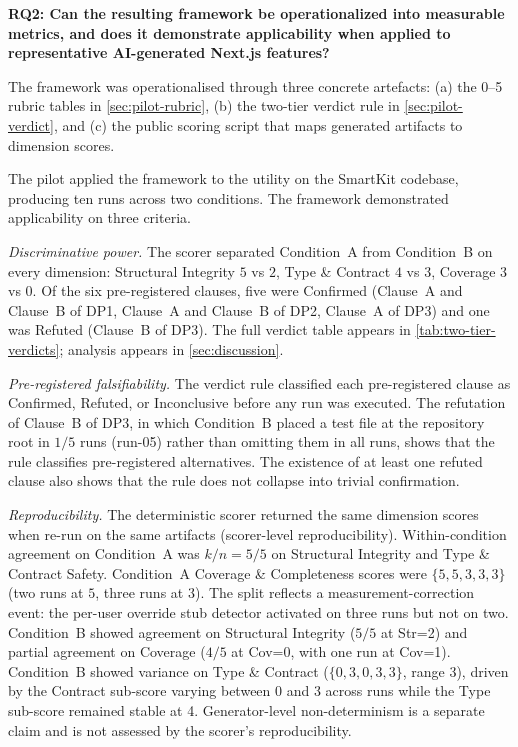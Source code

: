 \documentclass[12pt,a4paper]{report}
\begin{document}
\textbf{RQ2: Can the resulting framework be operationalized into measurable metrics, and does it demonstrate applicability when applied to representative AI-generated Next.js features?}

The framework was operationalised through three concrete artefacts: (a) the 0--5 rubric tables in \autoref{sec:pilot-rubric}, (b) the two-tier verdict rule in \autoref{sec:pilot-verdict}, and (c) the public scoring script that maps generated artifacts to dimension scores.

The pilot applied the framework to the  utility on the SmartKit codebase, producing ten runs across two conditions. The framework demonstrated applicability on three criteria.

\textit{Discriminative power.} The scorer separated Condition~A from Condition~B on every dimension: Structural Integrity $5$ vs $2$, Type \& Contract $4$ vs $3$, Coverage $3$ vs $0$. Of the six pre-registered clauses, five were Confirmed (Clause~A and Clause~B of DP1, Clause~A and Clause~B of DP2, Clause~A of DP3) and one was Refuted (Clause~B of DP3). The full verdict table appears in \autoref{tab:two-tier-verdicts}; analysis appears in \autoref{sec:discussion}.

\textit{Pre-registered falsifiability.} The verdict rule classified each pre-registered clause as Confirmed, Refuted, or Inconclusive before any run was executed. The refutation of Clause~B of DP3, in which Condition~B placed a test file at the repository root in $1/5$ runs (run-05) rather than omitting them in all runs, shows that the rule classifies pre-registered alternatives. The existence of at least one refuted clause also shows that the rule does not collapse into trivial confirmation.

\textit{Reproducibility.} The deterministic scorer returned the same dimension scores when re-run on the same artifacts (scorer-level reproducibility). Within-condition agreement on Condition~A was $k/n = 5/5$ on Structural Integrity and Type \& Contract Safety. Condition~A Coverage \& Completeness scores were $\{5, 5, 3, 3, 3\}$ (two runs at $5$, three runs at $3$). The split reflects a measurement-correction event: the per-user override stub detector activated on three runs but not on two. Condition~B showed agreement on Structural Integrity ($5/5$ at Str=2) and partial agreement on Coverage ($4/5$ at Cov=0, with one run at Cov=1). Condition~B showed variance on Type \& Contract ($\{0, 3, 0, 3, 3\}$, range 3), driven by the Contract sub-score varying between 0 and 3 across runs while the Type sub-score remained stable at 4. Generator-level non-determinism is a separate claim and is not assessed by the scorer's reproducibility.
\end{document}
